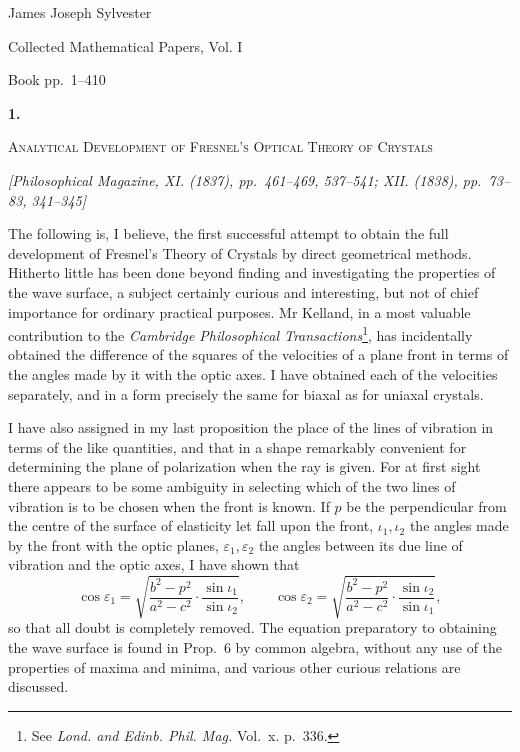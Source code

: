 \documentclass[11pt]{article}
\newcommand{\paperhead}[3]{%
  \clearpage
  \begin{center}
  {\Large\bfseries #1.}\par\vspace{0.85em}
  {\large\scshape #2}\par\vspace{0.6em}
  {\itshape [#3]}\par
  \end{center}\vspace{0.4em}}
\newcommand{\sourcepage}[1]{\marginpar{\scriptsize p.~#1}}
\begin{document}
\begin{center}
{\Large James Joseph Sylvester}\par\vspace{0.25em}
{\large Collected Mathematical Papers, Vol. I}\par\vspace{0.25em}
{\normalsize Book pp.~1--410}\par
\end{center}
\thispagestyle{empty}
\vspace{0.75em}

\paperhead{1}{Analytical Development of Fresnel's Optical Theory of Crystals}{Philosophical Magazine, XI. (1837), pp.~461--469, 537--541; XII. (1838), pp.~73--83, 341--345}

\sourcepage{1}
The following is, I believe, the first successful attempt to obtain the full development of Fresnel's Theory of Crystals by direct geometrical methods. Hitherto little has been done beyond finding and investigating the properties of the wave surface, a subject certainly curious and interesting, but not of chief importance for ordinary practical purposes. Mr Kelland, in a most valuable contribution to the \emph{Cambridge Philosophical Transactions}\footnote{See \emph{Lond. and Edinb. Phil. Mag.} Vol.~x. p.~336.}, has incidentally obtained the difference of the squares of the velocities of a plane front in terms of the angles made by it with the optic axes. I have obtained each of the velocities separately, and in a form precisely the same for biaxal as for uniaxal crystals.

I have also assigned in my last proposition the place of the lines of vibration in terms of the like quantities, and that in a shape remarkably convenient for determining the plane of polarization when the ray is given. For at first sight there appears to be some ambiguity in selecting which of the two lines of vibration is to be chosen when the front is known. If $p$ be the perpendicular from the centre of the surface of elasticity let fall upon the front, $\iota_1,\iota_2$ the angles made by the front with the optic planes, $\varepsilon_1,\varepsilon_2$ the angles between its due line of vibration and the optic axes, I have shown that
\[
\cos \varepsilon_1=
\sqrt{\frac{b^2-p^2}{a^2-c^2}\cdot\frac{\sin\iota_1}{\sin\iota_2}},
\qquad
\cos \varepsilon_2=
\sqrt{\frac{b^2-p^2}{a^2-c^2}\cdot\frac{\sin\iota_2}{\sin\iota_1}},
\]
so that all doubt is completely removed. The equation preparatory to obtaining the wave surface is found in Prop.~6 by common algebra, without any use of the properties of maxima and minima, and various other curious relations are discussed.
\end{document}
